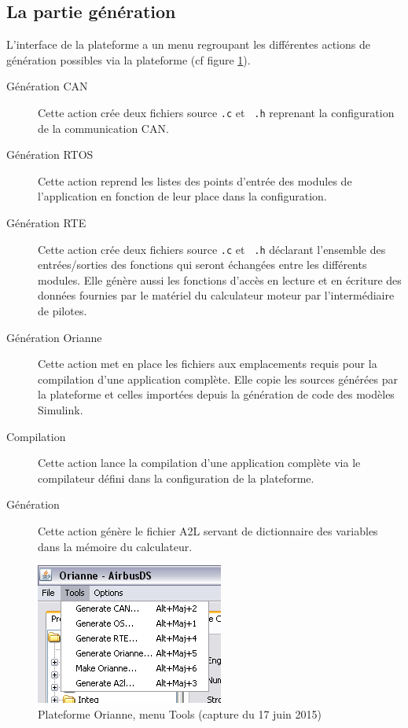\subsection{La partie génération}
L'interface de la plateforme a un menu regroupant les différentes actions de
génération possibles via la plateforme (cf figure \ref{fig:toolsMenu}).
\begin{description}
  \item[Génération CAN] Cette action crée deux fichiers source {\tt.c} et {\tt
	.h} reprenant la configuration de la communication CAN.
  \item[Génération RTOS] Cette action reprend les listes des points d'entrée des
	modules de l'application en fonction de leur place dans la configuration.
  \item[Génération RTE] Cette action crée deux fichiers source {\tt.c} et {\tt
	.h} déclarant l'ensemble des entrées/sorties des fonctions qui seront
	échangées entre les différents modules. Elle génère aussi les fonctions
	d'accès en lecture et en écriture des données fournies par le matériel du
	calculateur moteur par l'intermédiaire de pilotes.
  \item[Génération Orianne] Cette action met en place les fichiers aux
	emplacements requis pour la compilation d'une application complète. Elle
	copie les sources générées par la plateforme et celles importées depuis la
	génération de code des modèles Simulink\up{\circledR}.
  \item[Compilation] Cette action lance la compilation d'une application
	complète via le compilateur défini dans la configuration de la plateforme.
  \item[Génération ] Cette action génère le fichier A2L servant de
	dictionnaire des variables dans la mémoire du calculateur.
\end{description}

\begin{figure}[h]
  \centering
  \includegraphics[scale=0.7]{images/toolsMenu}
  \caption{Plateforme Orianne, menu Tools (capture du 17 juin 2015)}
  \label{fig:toolsMenu}
\end{figure}

